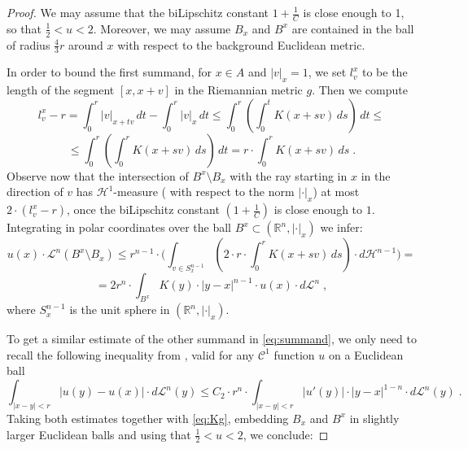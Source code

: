 \documentclass[12pt,leqno]{amsart}
\numberwithin{equation}{section}
\theoremstyle{definition}
\theoremstyle{remark}
\newcommand{\vol}{\mathrm{vol}}
\newcommand{\R}{\mathbb{R}}
\def\eps{\varepsilon}
\begin{document}
\begin{proof}
We may assume that the biLipschitz constant $1+\frac 1 C$ is close enough to 1,  so that $\frac 1 2 < u <2$. Moreover, we may assume $B_x$ and $B^x$ are contained in the ball of radius $\frac 4 3 r$ around $x$ with respect to the background Euclidean metric.


In order to bound the first summand,  for $x\in A$ and $|v|_x=1$,  we set $l^x_v$ to be the length of the segment $[x,x+v]$
in the Riemannian metric $g$.  Then we compute
$$l_v ^x -r= \int _0 ^r |v|_{x+tv} \, dt - \int _0 ^r |v|_x \, dt   \leq \int _0 ^r (\int _0 ^t  K(x+sv) \, ds)\, dt \leq $$
$$\leq \int _0 ^r (\int _0 ^r   K(x+sv) \, ds)\, dt = r\cdot \int _0 ^r   K(x+sv) \, ds  \; .$$
Observe now that the intersection of $B^x\setminus B_x$ with the ray starting in $x$ in the direction of $v$ has $\mathcal H^1$-measure
( with respect to the norm $|\cdot |_x$)
at most $2\cdot (l_v^x -r)$, once the biLipschitz constant $(1+\frac 1 C)$ is close enough to $1$.
Integrating in polar coordinates over the  ball $B^x\subset (\R^n, |\cdot|_x)$ we infer:
$$u(x)\cdot \mathcal L^n (B^x\setminus B_x) \leq r^{n-1} \cdot \Big (\int _{v\in S^{n-1} _x} ( 2\cdot r \cdot \int _0 ^r   K(x+sv) \, ds)
\cdot d\mathcal H^{n-1} \Big ) =$$
$$=2r^n \cdot \int _{B^x}  K(y) \cdot |y-x|^{n-1} \cdot u(x) \cdot d\mathcal L^n  \;,$$
where $S^{n-1} _x$ is the unit sphere in $(\R^n, |\cdot|_x)$.








To get a  similar estimate of the other summand in  \eqref{eq:summand},
we only need to  recall  the following inequality from \cite[Lemma 4.1]{Evans}, valid for any $\mathcal C^1$ function $u$ on a Euclidean ball
\[
 \int _{|x-y| < r} |u(y)-u(x)| \cdot d\mathcal L^n (y) \leq  C_2\cdot r^{n}\cdot  \int _{|x-y| < r}|u'(y)| \cdot |y-x| ^{1-n} \cdot d\mathcal L^n (y) \; .
 \]
Taking both estimates together with \eqref{eq:Kg},  embedding $B_x$ and $B^x$ in slightly larger Euclidean balls  and using  that $\frac 1 2 < u <2$, we conclude:


\end{proof}
\end{document}
